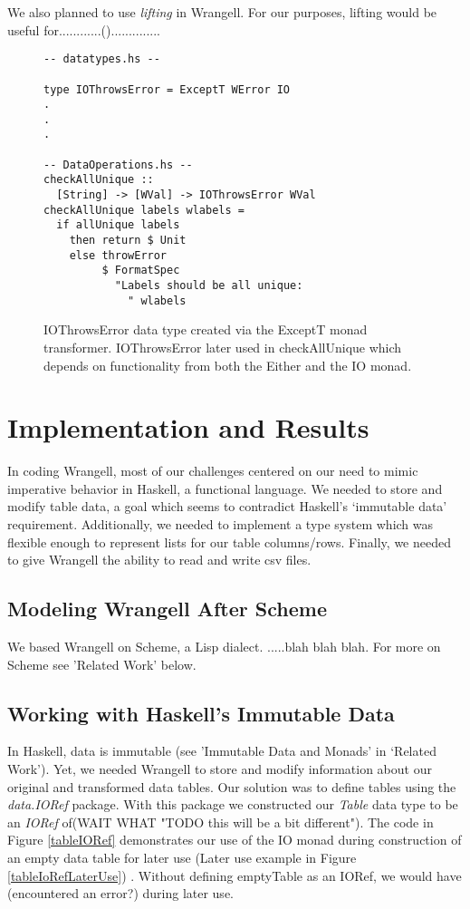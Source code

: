 \documentclass[preprint,nocopyrightspace]{sig-alternate}
\begin{document}
We also planned to use \emph{lifting} in Wrangell. For our purposes, lifting would be useful for............()..............

\begin{figure}
\begin{lstlisting}
-- datatypes.hs --

type IOThrowsError = ExceptT WError IO
.
.
.

-- DataOperations.hs --
checkAllUnique :: 
  [String] -> [WVal] -> IOThrowsError WVal
checkAllUnique labels wlabels = 
  if allUnique labels
    then return $ Unit 
    else throwError 
         $ FormatSpec 
           "Labels should be all unique: 
             " wlabels

\end{lstlisting}
\caption{IOThrowsError data type created via the ExceptT monad transformer. IOThrowsError later used in checkAllUnique which depends on functionality from both the Either and the IO monad.}
\label{IOThrowsError}
\end{figure}

  

\section{Implementation and Results}

In coding Wrangell, most of our challenges centered on our need to mimic imperative behavior in Haskell, a functional language. We needed to store and modify table data, a goal which seems to contradict Haskell's `immutable data' requirement. Additionally, we needed to implement a type system which was flexible enough to represent lists for our table columns/rows. Finally, we needed to give Wrangell the ability to read and write csv files.  

\subsection{Modeling Wrangell After Scheme}
We based Wrangell on Scheme, a Lisp dialect. .....blah blah blah. For more on Scheme see 'Related Work' below. 


\subsection{Working with Haskell's Immutable Data}
In Haskell, data is immutable (see 'Immutable Data and Monads' in `Related Work'). Yet, we needed Wrangell to store and modify information about our original and transformed data tables. Our solution was to define tables using the \emph{data.IORef} package. With this package we constructed our \emph{Table} data type to be an \emph{IORef} of(WAIT WHAT "TODO this will be a bit different"). The code in Figure \ref{tableIORef} demonstrates our use of the IO monad during construction of an empty data table for later use (Later use example in Figure \ref{tableIoRefLaterUse}) . 
Without defining emptyTable as an IORef, we would have (encountered an error?) during later use. 
\end{document}
